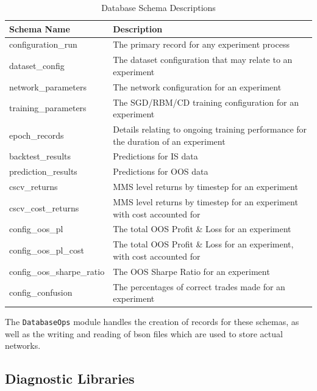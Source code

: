 \documentclass[a4paper,11pt,oneside]{article}
\theoremstyle{plain}
\theoremstyle{definition}
\begin{document}
	\begin{table}[h]
		\begin{tabular}{|p{0.3\linewidth}|p{0.7\linewidth}|}
			\hline
			\textbf{Schema Name} &\textbf{Description}  \\\hline	
			{configuration\_run} & {The primary record for any experiment process} \\\hline
			{dataset\_config} & {The dataset configuration that may relate to an experiment} \\\hline
			{network\_parameters} & {The network configuration for an experiment} \\\hline
			{training\_parameters} & {The SGD/RBM/CD training configuration for an experiment}  \\\hline
			{epoch\_records} & {Details relating to ongoing training performance for the duration of an experiment}  \\\hline
			{backtest\_results} & {Predictions for IS data}  \\\hline
			{prediction\_results} & {Predictions for OOS data}  \\\hline
			{cscv\_returns} & {MMS level returns by timestep for an experiment}  \\\hline
			{cscv\_cost\_returns} & {MMS level returns by timestep for an experiment with cost accounted for}  \\\hline
			{config\_oos\_pl} & {The total OOS Profit \& Loss for an experiment}  \\\hline
			{config\_oos\_pl\_cost} & {The total OOS Profit \& Loss for an experiment, with cost accounted for}  \\\hline
			{config\_oos\_sharpe\_ratio} & {The OOS Sharpe Ratio for an experiment}  \\\hline
			{config\_confusion} & {The percentages of correct trades made for an experiment}  \\\hline
		\end{tabular}
		\newline\newline
		\caption{Database Schema Descriptions}\label{tab_schemas}
	\end{table}
	
	The \texttt{DatabaseOps} module \citep{DCDatabaseOps} handles the creation of records for these schemas, as well as the writing and reading of bson files which are used to store actual networks.
	
	\subsection{Diagnostic Libraries}
	
\end{document}
